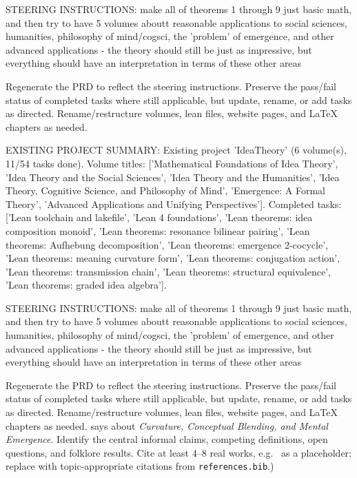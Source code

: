 STEERING INSTRUCTIONS: make all of theorems 1 through 9 just basic math, and then try to have 5 volumes aboutt reasonable applications to social sciences, humanities, philosophy of mind/cogsci, the 'problem' of emergence, and other advanced applications - the theory should still be just as impressive, but everything should have an interpretation in terms of these other areas

Regenerate the PRD to reflect the steering instructions. Preserve the pass/fail status of completed tasks where still applicable, but update, rename, or add tasks as directed. Rename/restructure volumes, lean files, website pages, and LaTeX chapters as needed.

EXISTING PROJECT SUMMARY: Existing project 'IdeaTheory' (6 volume(s), 11/54 tasks done). Volume titles: ['Mathematical Foundations of Idea Theory', 'Idea Theory and the Social Sciences', 'Idea Theory and the Humanities', 'Idea Theory, Cognitive Science, and Philosophy of Mind', 'Emergence: A Formal Theory', 'Advanced Applications and Unifying Perspectives']. Completed tasks: ['Lean toolchain and lakefile', 'Lean 4 foundations', 'Lean theorems: idea composition monoid', 'Lean theorems: resonance bilinear pairing', 'Lean theorems: Aufhebung decomposition', 'Lean theorems: emergence 2-cocycle', 'Lean theorems: meaning curvature form', 'Lean theorems: conjugation action', 'Lean theorems: transmission chain', 'Lean theorems: structural equivalence', 'Lean theorems: graded idea algebra'].

STEERING INSTRUCTIONS: make all of theorems 1 through 9 just basic math, and then try to have 5 volumes aboutt reasonable applications to social sciences, humanities, philosophy of mind/cogsci, the 'problem' of emergence, and other advanced applications - the theory should still be just as impressive, but everything should have an interpretation in terms of these other areas

Regenerate the PRD to reflect the steering instructions. Preserve the pass/fail status of completed tasks where still applicable, but update, rename, or add tasks as directed. Rename/restructure volumes, lean files, website pages, and LaTeX chapters as needed. says about \emph{Curvature, Conceptual Blending, and Mental Emergence}.  Identify the
        central informal claims, competing definitions, open questions, and
        folklore results.  Cite at least 4--8 real works, e.g.\ \cite{
        lean4_tpil} as a placeholder; replace with topic-appropriate
        citations from \texttt{references.bib}.)

